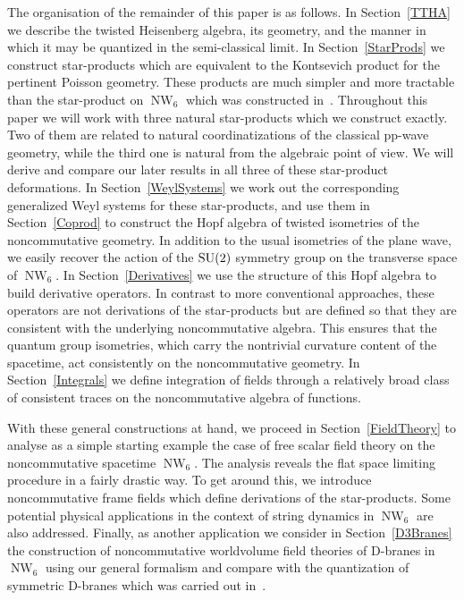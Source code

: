 \documentclass[11pt,a4paper]{article}
\DeclareMathOperator{\NW}{NW}
\newcommand{\1}{\mathbb{1}}
\begin{document}
The organisation of the remainder of this paper is as follows. In
Section~\ref{TTHA} we describe the twisted Heisenberg algebra, its
geometry, and the manner in which it may be quantized in the
semi-classical limit. In Section~\ref{StarProds} we construct
star-products which are equivalent to the Kontsevich product for the
pertinent Poisson geometry. These products are much simpler and more
tractable than the star-product on $\NW_6$ which was constructed
in~\cite{HSz1}. Throughout this paper we will work with
three natural star-products which we construct exactly. Two of them
are related to natural coordinatizations of the classical pp-wave
geometry, while the third one is natural from the algebraic point of
view. We will derive and compare our later results in all three of
these star-product deformations. In Section~\ref{WeylSystems} we work
out the corresponding generalized Weyl systems for these
star-products, and use them in Section~\ref{Coprod} to construct the
Hopf algebra of twisted isometries of the noncommutative geometry. In
addition to the usual isometries of the plane wave, we easily recover
the action of the ${\rm SU}(2)$ symmetry group on the transverse space
of $\NW_6$. In Section~\ref{Derivatives} we use the structure of this
Hopf algebra to build derivative operators. In contrast to more
conventional approaches, these operators are not derivations of the
star-products but are defined so that they are consistent with the
underlying noncommutative algebra. This ensures that the quantum group
isometries, which carry the nontrivial curvature content of the
spacetime, act consistently on the noncommutative geometry. In
Section~\ref{Integrals} we define integration of fields through a
relatively broad class of consistent traces on the noncommutative
algebra of functions.

With these general constructions at hand, we proceed in
Section~\ref{FieldTheory} to analyse as a simple starting example the
case of free scalar field theory on the noncommutative spacetime
$\NW_6$. The analysis reveals the flat space limiting procedure in a
fairly drastic way. To get around this, we introduce noncommutative
frame fields which define derivations of the star-products. Some
potential physical applications in the context of string dynamics in
$\NW_6$ are also addressed. Finally, as another application we
consider in Section~\ref{D3Branes} the construction of noncommutative
worldvolume field theories of D-branes in $\NW_6$ using our general
formalism and compare with the quantization of symmetric D-branes
which was carried out in~\cite{HSz1}.
\end{document}
